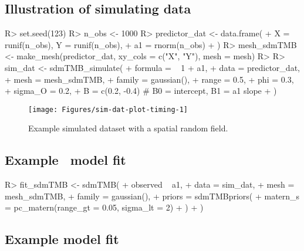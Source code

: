 \documentclass[article]{jss}\usepackage[]{graphicx}\usepackage[dvipsnames]{xcolor}
\newcommand{\sdmTMB}{\pkg{sdmTMB}}
\begin{document}
\subsection{Illustration of simulating data}

\begin{Schunk}
\begin{Sinput}
R> set.seed(123)
R> n_obs <- 1000
R> predictor_dat <- data.frame(
+    X = runif(n_obs), Y = runif(n_obs),
+    a1 = rnorm(n_obs)
+  )
R> mesh_sdmTMB <- make_mesh(predictor_dat, xy_cols = c("X", "Y"), mesh = mesh)
R> 
R> sim_dat <- sdmTMB_simulate(
+    formula = ~ 1 + a1,
+    data = predictor_dat,
+    mesh = mesh_sdmTMB,
+    family = gaussian(),
+    range = 0.5,
+    phi = 0.3,
+    sigma_O = 0.2,
+    B = c(0.2, -0.4) # B0 = intercept, B1 = a1 slope
+  )
\end{Sinput}
\end{Schunk}


\begin{Schunk}
\begin{figure}[ht]

{\centering \texttt{[image: Figures/sim-dat-plot-timing-1]} 

}

\caption[Example simulated dataset with a spatial random field]{Example simulated dataset with a spatial random field.}\label{fig:sim-dat-plot-timing}
\end{figure}
\end{Schunk}

\subsection[Example sdmTMB model fit]{Example \sdmTMB\ model fit}

\begin{Schunk}
\begin{Sinput}
R> fit_sdmTMB <- sdmTMB(
+    observed ~ a1,
+    data = sim_dat,
+    mesh = mesh_sdmTMB,
+    family = gaussian(),
+    priors = sdmTMBpriors(
+      matern_s = pc_matern(range_gt = 0.05, sigma_lt = 2)
+    )
+  )
\end{Sinput}
\end{Schunk}

\subsection[Example spaMM model fit]{Example  model fit}
\end{document}
